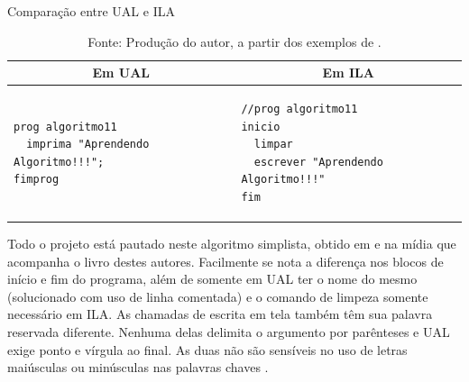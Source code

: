 \begin{table}[h]
\centering
  \caption{Comparação entre UAL e ILA}\label{tab:compare-ualila}
\begin{tabular}{p{75mm} | p{75mm}}\hline
\multicolumn{1}{c|}{\textbf{Em UAL}} & \multicolumn{1}{c}{\textbf{Em ILA}} \\ \hline
\begin{lstlisting}[language=ual,style=table]
prog algoritmo11
  imprima "Aprendendo Algoritmo!!!";
fimprog
\end{lstlisting} &
\begin{lstlisting}[language=ila,style=table]
//prog algoritmo11
inicio
  limpar
  escrever "Aprendendo Algoritmo!!!"
fim
\end{lstlisting} \\ \hline
\end{tabular}
  \caption*{\ifdraft{\color{green}}{}\footnotesize Fonte: Produção do autor, a partir dos exemplos de .}
\end{table}

Todo o projeto está pautado neste algoritmo simplista, obtido em  e na mídia que acompanha o livro destes autores. Facilmente se nota a diferença nos blocos de início e fim do programa, além de somente em UAL ter o nome do mesmo (solucionado com uso de linha comentada) e o comando de limpeza somente necessário em ILA. As chamadas de escrita em tela também têm sua palavra reservada diferente. Nenhuma delas delimita o argumento por parênteses e UAL exige ponto e vírgula ao final. As duas não são sensíveis no uso de letras maiúsculas ou minúsculas nas palavras chaves .

